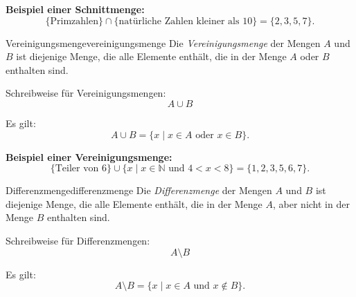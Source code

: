 \textbf{Beispiel einer Schnittmenge:}
\[
    \{\text{Primzahlen}\}
    \cap
    \{\text{natürliche Zahlen kleiner als } 10\}
    =
    \{2,3,5,7\}.
\]

\begin{definition}{Vereinigungsmenge}{vereinigungsmenge}
    Die \textit{Vereinigungsmenge} der Mengen \(A\) und \(B\) ist diejenige Menge, die alle Elemente enthält, die in der Menge \(A\) oder \(B\) enthalten sind.

    Schreibweise für Vereinigungsmengen:
    \[
        A \cup B
    \]

    Es gilt:
    \[
        A \cup B = \{x \mid x \in A \text{ oder } x \in B\}.
    \]

    \begin{center}
    \end{center}
\end{definition}

\textbf{Beispiel einer Vereinigungsmenge:}
\[
    \{\text{Teiler von } 6\}
    \cup
    \{x \mid x \in \mathbb{N} \text{ und } 4 < x < 8\}
    =
    \{1,2,3,5,6,7\}.
\]

\begin{definition}{Differenzmenge}{differenzmenge}
    Die \textit{Differenzmenge} der Mengen \(A\) und \(B\) ist diejenige Menge, die alle Elemente enthält, die in der Menge \(A\), aber nicht in der Menge \(B\) enthalten sind.

    Schreibweise für Differenzmengen:
    \[
        A \setminus B
    \]

    Es gilt:
    \[
        A \setminus B
        =
        \{x \mid x \in A \text{ und } x \notin B\}.
    \]

    \begin{center}
    \end{center}
\end{definition}

